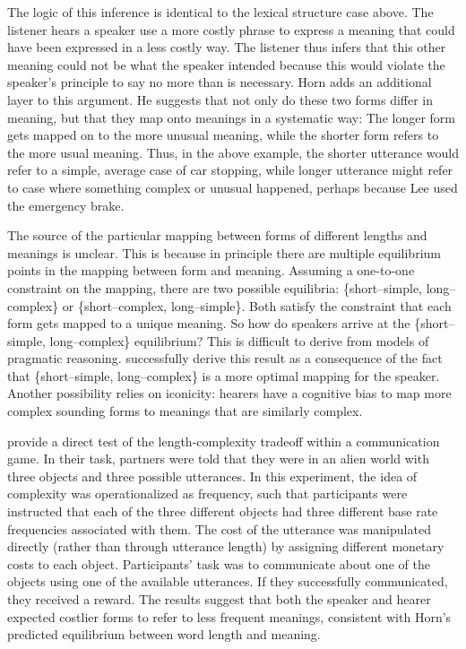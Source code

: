 \documentclass[man]{apa2}
\begin{document}
The logic of this inference is identical to the lexical structure case above. The listener hears a speaker use a more costly phrase to express a meaning that could have been expressed in a less costly way. The listener thus infers that this other meaning could not be what the speaker intended because this would violate the speaker's principle to say no more than is necessary. Horn adds an additional layer to this argument. He suggests that not only do these two forms differ in meaning, but that they map onto meanings in a systematic way: The longer form gets mapped on to the more unusual meaning, while the shorter form refers to the more usual meaning. Thus, in the above example, the shorter utterance would refer to a simple, average case of car stopping, while longer utterance might refer to case where something complex or unusual happened, perhaps because Lee used the emergency brake.

The source of the particular mapping between forms of different lengths and meanings is unclear. This is because in principle there are multiple equilibrium points in the mapping between form and meaning. Assuming a one-to-one constraint on the mapping, there are two possible equilibria: \{short--simple, long--complex\} or \{short--complex, long--simple\}. Both satisfy the constraint that each form gets mapped to a unique meaning. So how do speakers arrive at the \{short--simple, long--complex\} equilibrium? This is difficult to derive from models of pragmatic reasoning.  successfully derive this result as a consequence of the fact that \{short--simple, long--complex\} is a more optimal mapping for the speaker. Another possibility relies on iconicity: hearers have a cognitive bias to map more complex sounding forms to meanings that are similarly complex. 

  provide a direct test of the length-complexity tradeoff within a communication game. In their task, partners were told that they were in an alien world with three objects and three possible utterances. In this experiment, the idea of complexity was operationalized as frequency, such that participants were instructed that each of the three different objects had three different base rate frequencies associated with them. The cost of the utterance was manipulated directly (rather than through utterance length) by assigning different monetary costs to each object. Participants' task was to communicate about one of the objects using one of the available utterances. If they successfully communicated, they received a reward. The results suggest that both the speaker and hearer expected costlier forms to refer to less frequent meanings, consistent with Horn's predicted equilibrium between word length and meaning.
\end{document}

